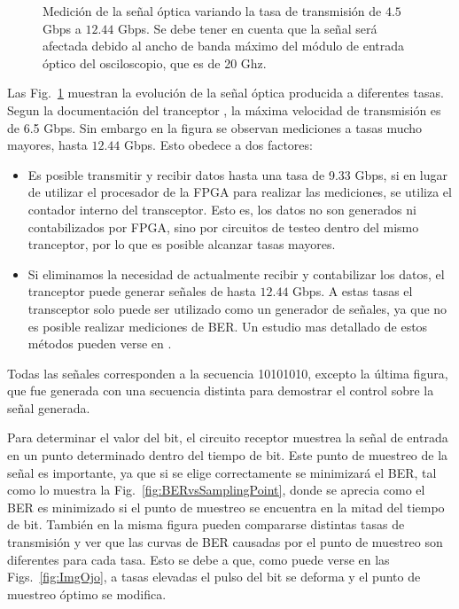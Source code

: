 \begin{figure}[!t]
   \qquad
  \caption {Medición de la señal óptica variando la tasa de transmisión de $4.5$ Gbps a $12.44$ Gbps. Se debe tener en cuenta que la señal será afectada debido al ancho de banda máximo del módulo de entrada óptico del osciloscopio, que es de 20 Ghz.}
  \label{fig:ImgTasa}
\end{figure}





Las Fig.~\ref{fig:ImgTasa} muestran la evolución de la señal óptica producida a diferentes
tasas. Segun la documentación del tranceptor \cite{ug198}, la máxima velocidad de transmisión es de 6.5 Gbps. Sin embargo en la figura se observan mediciones a tasas mucho mayores, hasta $12.44$ Gbps. Esto obedece a dos factores:
\begin{itemize}
 \item Es posible transmitir y recibir datos hasta una tasa de 9.33 Gbps, si en lugar de utilizar el procesador de la FPGA para realizar las mediciones, se utiliza el contador interno del transceptor. Esto es, los datos no son generados ni contabilizados por FPGA, sino por circuitos de testeo dentro del mismo tranceptor, por lo que es posible alcanzar tasas mayores.
 \item Si eliminamos la necesidad de actualmente recibir y contabilizar los datos, el tranceptor puede generar señales de hasta $12.44$ Gbps. A estas tasas el transceptor solo puede ser utilizado como un generador de señales, ya que no es posible realizar mediciones de BER. Un estudio mas detallado de estos métodos pueden verse en \cite{ortegaaltas}.
\end{itemize}


Todas las señales corresponden a la secuencia 10101010, excepto la última figura,
que fue generada con una secuencia distinta para demostrar el control sobre la señal generada.

Para determinar el valor del bit, el circuito receptor muestrea la señal de entrada en un punto determinado dentro del tiempo de bit. Este punto de muestreo de la señal es importante, ya que si se elige correctamente se minimizará el BER, tal como lo muestra la Fig.~\ref{fig:BERvsSamplingPoint}, donde se aprecia como el BER es minimizado si el punto de muestreo se encuentra en la mitad del tiempo de bit. También en la misma figura pueden compararse distintas tasas de transmisión y ver que las curvas de BER causadas por el punto de muestreo son diferentes para cada tasa. Esto se debe a que, como puede verse en las Figs.~\ref{fig:ImgOjo}, a tasas elevadas el pulso del bit se deforma y el punto de muestreo óptimo se modifica.


